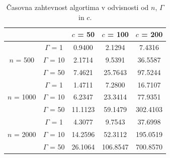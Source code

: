 \documentclass[a4paper,12pt]{article}
\theoremstyle{definition}
\begin{document}
 \begin{table}[h]
    \centering
    \begin{tabular}{c|c|c|c|c|}
    \cline{3-5}
    \multicolumn{2}{c|}{}                                     & $c$ = 50  & $c$ = 100  & $c$ = 200  \\ \hline
    \multicolumn{1}{|c|}{\multirow{3}{*}{$n$ = 500}}  & $\Gamma$ = 1 & 0.9400  & 2.1294   & 7.4316   \\ \cline{2-5} 
    \multicolumn{1}{|c|}{}                          & $\Gamma$ = 10 & 2.1714  & 9.5391   & 36.5587  \\ \cline{2-5} 
    \multicolumn{1}{|c|}{}                          & $\Gamma$ = 50 & 7.4621  & 25.7643  & 97.5244  \\ \hline
    \multicolumn{1}{|c|}{\multirow{3}{*}{$n$ = 1000}} & $\Gamma$ = 1  & 1.4711  & 7.2800   & 16.7107  \\ \cline{2-5} 
    \multicolumn{1}{|c|}{}                          & $\Gamma$ = 10 & 6.2347  & 23.3414  & 77.9351  \\ \cline{2-5} 
    \multicolumn{1}{|c|}{}                          & $\Gamma$ = 50 & 11.1123 & 59.1479  & 302.4103 \\ \hline
    \multicolumn{1}{|c|}{\multirow{3}{*}{$n$ = 2000}} & $\Gamma$ = 1  & 4.3077  & 9.7543   & 37.6998  \\ \cline{2-5} 
    \multicolumn{1}{|c|}{}                          & $\Gamma$ = 10 & 14.2596 & 52.3112  & 195.0519 \\ \cline{2-5} 
    \multicolumn{1}{|c|}{}                          & $\Gamma$ = 50 & 26.1064 & 106.8547 & 700.8570 \\ \hline
    \end{tabular}
    \caption{\label{tab:tab1}Časovna zahtevnost algortima v odvisnosti od $n$, $\Gamma$ in $c$.}
\end{table}
\end{document}
